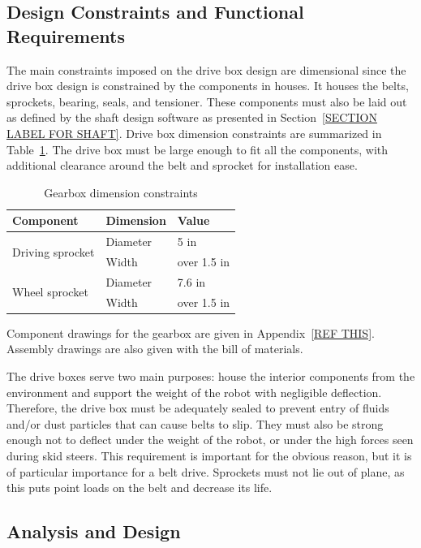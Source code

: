 \subsection{Design Constraints and Functional Requirements}

The main constraints imposed on the drive box design are dimensional since the drive box design is constrained by the components in houses. It houses the belts, sprockets, bearing, seals, and tensioner. These components must also be laid out as defined by the shaft design software as presented in Section~\ref{SECTION LABEL FOR SHAFT}. %
Drive box dimension constraints are summarized in Table~\ref{tab:box_dim}. The drive box must be large enough to fit all the components, with additional clearance around the belt and sprocket for installation ease.

\begin{table}[htbp]
\centering
\caption{Gearbox dimension constraints}
\begin{tabular}{| lll |}\hline
Component & Dimension & Value \\ \hline
\multirow{2}{*}{Driving sprocket} & Diameter & 5  in \\
& Width & over 1.5 in \\
\multirow{2}{*}{Wheel sprocket} & Diameter & 7.6  in \\
& Width & over 1.5 in \\ \hline
\end{tabular}
\label{tab:box_dim}
\end{table}

Component drawings for the gearbox are given in Appendix~\ref{REF THIS}. Assembly drawings are also given with the bill of materials.

The drive boxes serve two main purposes: house the interior components from the environment and support the weight of the robot with negligible deflection. Therefore, the drive box must be adequately sealed to prevent entry of fluids and/or dust particles that can cause belts to slip. They must also be strong enough not to deflect under the weight of the robot, or under the high forces seen during skid steers. This requirement is important for the obvious reason, but it is of particular importance for a belt drive. Sprockets must not lie out of plane, as this puts point loads on the belt and decrease its life.

\subsection{Analysis and Design}

